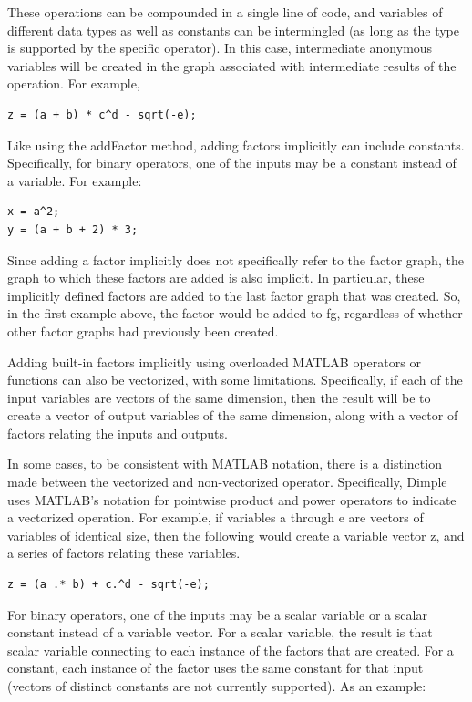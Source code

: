 These operations can be compounded in a single line of code, and variables of different data types as well as constants can be intermingled (as long as the type is supported by the specific operator).  In this case, intermediate anonymous variables will be created in the graph associated with intermediate results of the operation.  For example,

\begin{lstlisting}
z = (a + b) * c^d - sqrt(-e);
\end{lstlisting}

Like using the addFactor method, adding factors implicitly can include constants.  Specifically, for binary operators, one of the inputs may be a constant instead of a variable.  For example:

\begin{lstlisting}
x = a^2;
y = (a + b + 2) * 3;
\end{lstlisting}

Since adding a factor implicitly does not specifically refer to the factor graph, the graph to which these factors are added is also implicit.  In particular, these implicitly defined factors are added to the last factor graph that was created.  So, in the first example above, the factor would be added to fg, regardless of whether other factor graphs had previously been created.

Adding built-in factors implicitly using overloaded MATLAB operators or functions can also be vectorized, with some limitations.  Specifically, if each of the input variables are vectors of the same dimension, then the result will be to create a vector of output variables of the same dimension, along with a vector of factors relating the inputs and outputs.

In some cases, to be consistent with MATLAB notation, there is a distinction made between the vectorized and non-vectorized operator.  Specifically, Dimple uses MATLAB's notation for pointwise product and power operators to indicate a vectorized operation.  For example, if variables a through e are vectors of variables of identical size, then the following would create a variable vector z, and a series of factors relating these variables.

\begin{lstlisting}
z = (a .* b) + c.^d - sqrt(-e);
\end{lstlisting}

For binary operators, one of the inputs may be a scalar variable or a scalar constant instead of a variable vector.  For a scalar variable, the result is that scalar variable connecting to each instance of the factors that are created.  For a constant, each instance of the factor uses the same constant for that input (vectors of distinct constants are not currently supported).  As an example:

